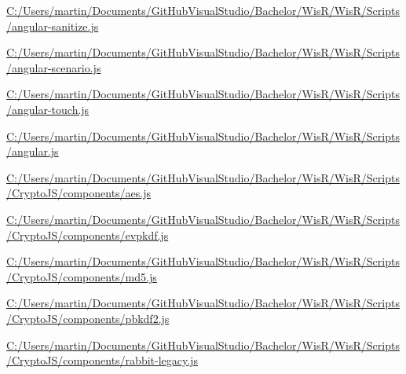 \begin{DoxyCompactItemize}
\item 
\hyperlink{_c_1_2_users_2martin_2_documents_2_git_hub_visual_studio_2_bachelor_2_wis_r_2_wis_r_2_scripts_2angular-sanitize_8js-example}{C\+:/\+Users/martin/\+Documents/\+Git\+Hub\+Visual\+Studio/\+Bachelor/\+Wis\+R/\+Wis\+R/\+Scripts/angular-\/sanitize.\+js}
\item 
\hyperlink{_c_1_2_users_2martin_2_documents_2_git_hub_visual_studio_2_bachelor_2_wis_r_2_wis_r_2_scripts_2angular-scenario_8js-example}{C\+:/\+Users/martin/\+Documents/\+Git\+Hub\+Visual\+Studio/\+Bachelor/\+Wis\+R/\+Wis\+R/\+Scripts/angular-\/scenario.\+js}
\item 
\hyperlink{_c_1_2_users_2martin_2_documents_2_git_hub_visual_studio_2_bachelor_2_wis_r_2_wis_r_2_scripts_2angular-touch_8js-example}{C\+:/\+Users/martin/\+Documents/\+Git\+Hub\+Visual\+Studio/\+Bachelor/\+Wis\+R/\+Wis\+R/\+Scripts/angular-\/touch.\+js}
\item 
\hyperlink{_c_1_2_users_2martin_2_documents_2_git_hub_visual_studio_2_bachelor_2_wis_r_2_wis_r_2_scripts_2angular_8js-example}{C\+:/\+Users/martin/\+Documents/\+Git\+Hub\+Visual\+Studio/\+Bachelor/\+Wis\+R/\+Wis\+R/\+Scripts/angular.\+js}
\item 
\hyperlink{_c_1_2_users_2martin_2_documents_2_git_hub_visual_studio_2_bachelor_2_wis_r_2_wis_r_2_scripts_2_2216be9667131f049aed9bcc721c5125}{C\+:/\+Users/martin/\+Documents/\+Git\+Hub\+Visual\+Studio/\+Bachelor/\+Wis\+R/\+Wis\+R/\+Scripts/\+Crypto\+J\+S/components/aes.\+js}
\item 
\hyperlink{_c_1_2_users_2martin_2_documents_2_git_hub_visual_studio_2_bachelor_2_wis_r_2_wis_r_2_scripts_2_9eb0b9e2a7d91accbbf8813c9b28b0e7}{C\+:/\+Users/martin/\+Documents/\+Git\+Hub\+Visual\+Studio/\+Bachelor/\+Wis\+R/\+Wis\+R/\+Scripts/\+Crypto\+J\+S/components/evpkdf.\+js}
\item 
\hyperlink{_c_1_2_users_2martin_2_documents_2_git_hub_visual_studio_2_bachelor_2_wis_r_2_wis_r_2_scripts_2_f711bcf880480968d4e4e4c00b21e685}{C\+:/\+Users/martin/\+Documents/\+Git\+Hub\+Visual\+Studio/\+Bachelor/\+Wis\+R/\+Wis\+R/\+Scripts/\+Crypto\+J\+S/components/md5.\+js}
\item 
\hyperlink{_c_1_2_users_2martin_2_documents_2_git_hub_visual_studio_2_bachelor_2_wis_r_2_wis_r_2_scripts_2_c9f0033d24db692302d7976ced75f6f5}{C\+:/\+Users/martin/\+Documents/\+Git\+Hub\+Visual\+Studio/\+Bachelor/\+Wis\+R/\+Wis\+R/\+Scripts/\+Crypto\+J\+S/components/pbkdf2.\+js}
\item 
\hyperlink{_c_1_2_users_2martin_2_documents_2_git_hub_visual_studio_2_bachelor_2_wis_r_2_wis_r_2_scripts_2_3d4b76b531bc45958a77b0fd11af6022}{C\+:/\+Users/martin/\+Documents/\+Git\+Hub\+Visual\+Studio/\+Bachelor/\+Wis\+R/\+Wis\+R/\+Scripts/\+Crypto\+J\+S/components/rabbit-\/legacy.\+js}

\end{DoxyCompactItemize}
